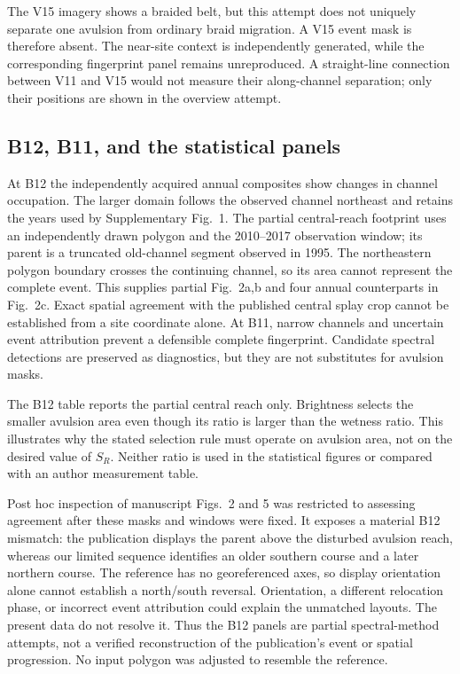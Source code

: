 \documentclass[11pt]{article}
\begin{document}
The V15 imagery shows a braided belt, but this attempt does not uniquely
separate one avulsion from ordinary braid migration. A V15 event mask is
therefore absent. The near-site context is independently generated, while
the corresponding fingerprint panel remains unreproduced. A straight-line
connection between V11 and V15 would not measure their along-channel
separation; only their positions are shown in the overview attempt.

\subsection{B12, B11, and the statistical panels}
At B12 the independently acquired annual composites show changes in channel
occupation. The larger domain follows the observed channel northeast and
retains the years used by Supplementary Fig.~1. The partial central-reach
footprint uses an independently drawn polygon and the 2010--2017 observation
window; its parent is a truncated old-channel segment observed in 1995.
The northeastern polygon boundary crosses the continuing channel, so its
area cannot represent the complete event. This supplies partial Fig.~2a,b
and four annual counterparts in Fig.~2c. Exact spatial agreement with
the published central splay crop cannot be established from a site coordinate
alone. At B11, narrow channels and uncertain event attribution prevent a
defensible complete fingerprint. Candidate spectral detections are preserved
as diagnostics, but they are not substitutes for avulsion masks.

\begin{center}\small\end{center}
The B12 table reports the partial central reach only. Brightness selects the
smaller avulsion area even though its ratio is larger than the wetness ratio.
This illustrates why the stated selection rule must operate on avulsion area,
not on the desired value of $S_R$. Neither ratio is used in the statistical
figures or compared with an author measurement table.

Post hoc inspection of manuscript Figs.~2 and 5 was restricted to assessing
agreement after these masks and windows were fixed. It exposes a material
B12 mismatch: the publication displays the parent above the disturbed
avulsion reach, whereas our limited sequence identifies an older southern
course and a later northern course. The reference has no georeferenced axes,
so display orientation alone cannot establish a north/south reversal.
Orientation, a different relocation phase, or incorrect event attribution
could explain the unmatched layouts. The present data do not resolve it.
Thus the B12 panels are partial spectral-method attempts, not a verified
reconstruction of the publication's event or spatial progression. No input
polygon was adjusted to resemble the reference.
\end{document}
